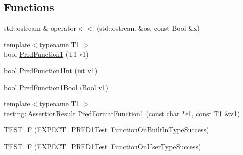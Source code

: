 \subsection*{Functions}
\begin{DoxyCompactItemize}
\item 
std\+::ostream \& \mbox{\hyperlink{_obj__test_2lib_2googletest-release-1_88_81_2googletest_2test_2gtest__pred__impl__unittest_8cc_a0bf98bd8ef2c5ea5ea36ff15c1248b8a}{operator$<$$<$}} (std\+::ostream \&os, const \mbox{\hyperlink{struct_bool}{Bool}} \&\mbox{\hyperlink{_obj__test_2lib_2googletest-master_2googlemock_2test_2gmock-matchers__test_8cc_a6150e0515f7202e2fb518f7206ed97dc}{x}})
\item 
{\footnotesize template$<$typename T1 $>$ }\\bool \mbox{\hyperlink{_obj__test_2lib_2googletest-release-1_88_81_2googletest_2test_2gtest__pred__impl__unittest_8cc_aa8827b7fab495de26f406affdf47a697}{Pred\+Function1}} (T1 v1)
\item 
bool \mbox{\hyperlink{_obj__test_2lib_2googletest-release-1_88_81_2googletest_2test_2gtest__pred__impl__unittest_8cc_a0cfa23f9b62be9c5bf65d0971510bac5}{Pred\+Function1\+Int}} (int v1)
\item 
bool \mbox{\hyperlink{_obj__test_2lib_2googletest-release-1_88_81_2googletest_2test_2gtest__pred__impl__unittest_8cc_a1c12be7e61ecd333d5c9d5f251d3809f}{Pred\+Function1\+Bool}} (\mbox{\hyperlink{struct_bool}{Bool}} v1)
\item 
{\footnotesize template$<$typename T1 $>$ }\\testing\+::\+Assertion\+Result \mbox{\hyperlink{_obj__test_2lib_2googletest-release-1_88_81_2googletest_2test_2gtest__pred__impl__unittest_8cc_af5b63802199e417c73c46cbacc73f4ed}{Pred\+Format\+Function1}} (const char $\ast$e1, const T1 \&v1)
\item 
\mbox{\hyperlink{_obj__test_2lib_2googletest-release-1_88_81_2googletest_2test_2gtest__pred__impl__unittest_8cc_acf6422eca13944f695085fc6c7527748}{T\+E\+S\+T\+\_\+F}} (\mbox{\hyperlink{googletest-master_2googletest_2test_2gtest__pred__impl__unittest_8cc_ad745775376a8f891faadd4d168798bab}{E\+X\+P\+E\+C\+T\+\_\+\+P\+R\+E\+D1\+Test}}, Function\+On\+Built\+In\+Type\+Success)
\item 
\mbox{\hyperlink{_obj__test_2lib_2googletest-release-1_88_81_2googletest_2test_2gtest__pred__impl__unittest_8cc_a7ae9f4aac70507b021c7f828ba06c600}{T\+E\+S\+T\+\_\+F}} (\mbox{\hyperlink{googletest-master_2googletest_2test_2gtest__pred__impl__unittest_8cc_ad745775376a8f891faadd4d168798bab}{E\+X\+P\+E\+C\+T\+\_\+\+P\+R\+E\+D1\+Test}}, Function\+On\+User\+Type\+Success)

\end{DoxyCompactItemize}
